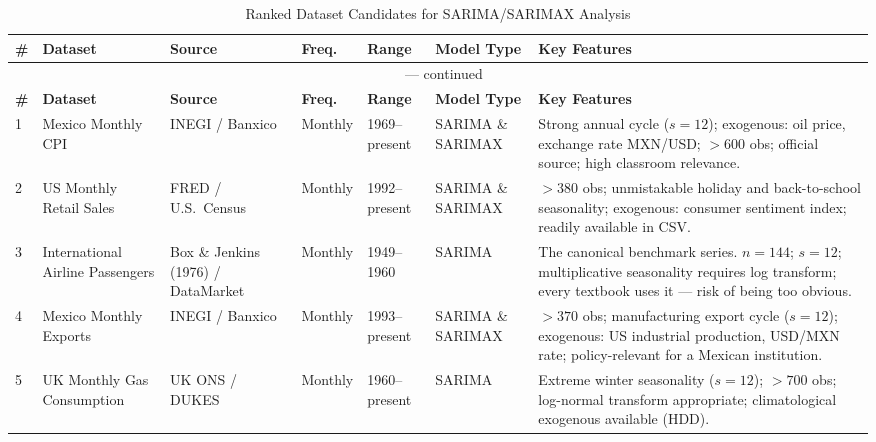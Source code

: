\documentclass[12pt,a4paper]{article}
\begin{document}

\begin{longtable}{p{} p{} p{} p{} p{} p{} p{}}
\caption{Ranked Dataset Candidates for SARIMA/SARIMAX Analysis}\label{tab:datasets}\\
\toprule
\textbf{\#} & \textbf{Dataset} & \textbf{Source} & \textbf{Freq.} & \textbf{Range} & \textbf{Model Type} & \textbf{Key Features} \\
\midrule
\endfirsthead
\multicolumn{7}{c}{{\tablename\ \thetable{} — continued}}\\
\toprule
\textbf{\#} & \textbf{Dataset} & \textbf{Source} & \textbf{Freq.} & \textbf{Range} & \textbf{Model Type} & \textbf{Key Features} \\
\midrule
\endhead
\bottomrule
\endfoot
\bottomrule
\endlastfoot

1 & Mexico Monthly CPI & INEGI / Banxico & Monthly & 1969–present & SARIMA \& SARIMAX & Strong annual cycle ($s=12$); exogenous: oil price, exchange rate MXN/USD; $>600$ obs; official source; high classroom relevance. \\[4pt]

2 & US Monthly Retail Sales & FRED / U.S.\ Census & Monthly & 1992–present & SARIMA \& SARIMAX & $>380$ obs; unmistakable holiday and back-to-school seasonality; exogenous: consumer sentiment index; readily available in CSV. \\[4pt]

3 & International Airline Passengers & Box \& Jenkins (1976) / DataMarket & Monthly & 1949–1960 & SARIMA & The canonical benchmark series. $n=144$; $s=12$; multiplicative seasonality requires log transform; every textbook uses it — risk of being too obvious. \\[4pt]

4 & Mexico Monthly Exports & INEGI / Banxico & Monthly & 1993–present & SARIMA \& SARIMAX & $>370$ obs; manufacturing export cycle ($s=12$); exogenous: US industrial production, USD/MXN rate; policy-relevant for a Mexican institution. \\[4pt]

5 & UK Monthly Gas Consumption & UK ONS / DUKES & Monthly & 1960–present & SARIMA & Extreme winter seasonality ($s=12$); $>700$ obs; log-normal transform appropriate; climatological exogenous available (HDD). \\[4pt]


\end{longtable}
\end{document}
